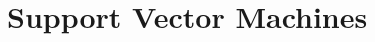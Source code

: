 \chapter{Support Vector Machines}

\begin{ex}
\end{ex}

\begin{ex}
\end{ex}

\begin{ex}
\end{ex}

\begin{ex}
\end{ex}